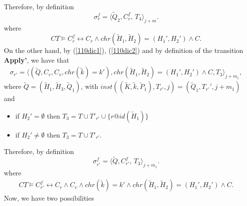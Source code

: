 \documentclass[final]{acmtrans2e}
\newcommand{\la}{\langle}
\newcommand{\ra}{\rangle}
\begin{document}
    Therefore, by definition
    $$ \sigma_{r}^f=\la\tilde Q_2, C_{r}^f, \, T_4\ra_{j+m}.
  $$
  where
\begin{equation}\label{13marzo21}
CT \models C_{r}^f \leftrightarrow  C_r\wedge
     chr(\tilde H_1, \tilde H_2)= (H_1', H_2')\wedge C.
\end{equation}
On the other hand, by (\ref{110dic1}), (\ref{110dic2}) and
by definition of the transition \textbf{Apply'}, we have that
$$\begin{array}{l}
    \sigma_{r'}=\la (\tilde Q, C_r, C_v,chr(\tilde k)= k'),
chr(\tilde H_1, \tilde H_2)= (H_1', H_2')\wedge C, T_3\ra_{j+m_1},
  \end{array}
  $$
     where
     $\tilde Q=(\tilde H_1,\tilde H_3,\tilde Q_1)$, with
     $inst ((\tilde K,\tilde k,\tilde P_1), T_{r'}, j)=(\tilde Q_1, T_{r'}', j+m_1)$ and
\begin{itemize}
    \item if $H_2'=\emptyset$ then $T_3=T \cup T'_{r'} \cup\{r @id (\tilde
H_1)\}$
    \item if $H_2'\not =\emptyset$ then $T_3=T \cup T'_{r'}$.
    \end{itemize}
    Therefore, by definition
    $$
    \sigma_{r'}^f=\la \tilde Q, C_{r'}^f, \, T_3\ra_{j+m_1}.$$
    where
    $$\begin{array}{l}
       CT \models C_{r'}^f \leftrightarrow  C_r\wedge
       C_v\wedge chr(\tilde k)= k'
       \wedge chr(\tilde H_1, \tilde H_2)= (H_1', H_2')\wedge C.
     \end{array}
    $$
Now, we have two possibilities
\end{document}
